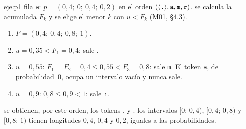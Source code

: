 \begin{solucion}{eje:p1}
\datos fila \texttt a: $p=(0{,}4;\ 0;\ 0{,}4;\ 0{,}2)$ en el orden $(\langle\texttt{.}\rangle,\texttt a,\texttt m,\texttt r)$.
\planteamiento se calcula la acumulada $F_k$ y se elige el menor $k$ con $u<F_k$ (M01, §4.3).
\pasos
\begin{enumerate}[label=\arabic*.]
  \item $F=(0{,}4;\ 0{,}4;\ 0{,}8;\ 1)$.
  \item $u=0{,}35<F_1=0{,}4$: sale \fin.
  \item $u=0{,}55$: $F_1=F_2=0{,}4\le 0{,}55<F_3=0{,}8$: sale \texttt m. El token \texttt a, de probabilidad~0, ocupa un intervalo vacío y nunca sale.
  \item $u=0{,}9$: $0{,}8\le 0{,}9<1$: sale \texttt r.
\end{enumerate}
\resultado se obtienen, por este orden, los tokens \fin,  y .
\comprobacion los intervalos $[0;\,0{,}4)$, $[0{,}4;\,0{,}8)$ y $[0{,}8;\,1)$ tienen longitudes $0{,}4$, $0{,}4$ y $0{,}2$, iguales a las probabilidades.

\end{solucion}

